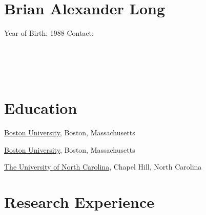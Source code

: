 %



\doublespacing

\setlength{\parindent}{0cm}


\section*{Brian Alexander Long}


Year of Birth: 1988 \newline
Contact: \\
\\
\\
\\
\\



\section*{Education}

\href{http://buphy.bu.edu/}{Boston University}, Boston, Massachusetts \newline
{}

\href{http://www.buphy.bu.edu/}{Boston University}, Boston, Massachusetts \newline
{}

\href{http://www.physics.unc.edu/}{The University of North Carolina}, Chapel Hill, North Carolina \newline
{}




\section*{Research Experience}

